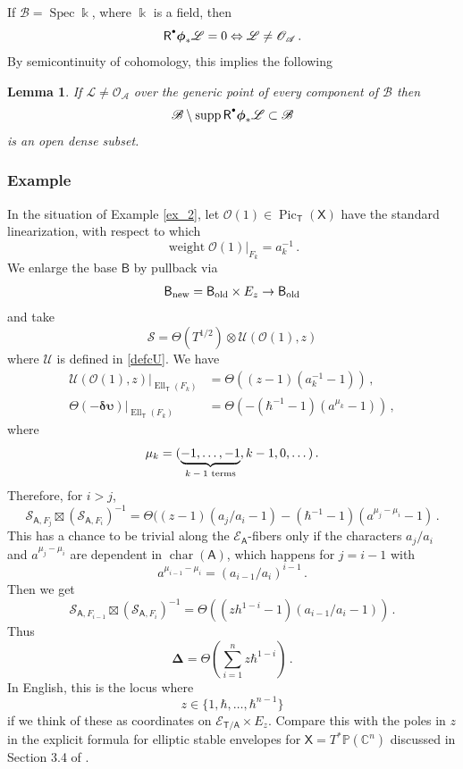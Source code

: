 \documentclass[14pt]{extarticle}
\newcommand{\Rd}{{\mathsf{R}}^{\raisebox{0.5mm}{$\scriptscriptstyle \bullet$}}}
\newcommand{\C}{\mathbb{C}}
\newcommand{\bT}{\mathsf{T}}
\newcommand{\bA}{\mathsf{A}}
\newcommand{\bB}{\mathsf{B}}
\newcommand{\bX}{\mathsf{X}}
\newcommand{\bP}{\mathbb{P}}
\newcommand{\cL}{\mathscr{L}}
\newcommand{\cU}{\mathscr{U}}
\newcommand{\cE}{\mathscr{E}}
\newcommand{\cA}{\mathscr{A}}
\newcommand{\cB}{\mathscr{B}}
\newcommand{\du}{\boldsymbol{\delta\upsilon}}
\newcommand{\bDel}{\boldsymbol{\Delta}}
\newcommand{\bphi}{\boldsymbol{\phi}}
\newcommand{\cS}{\mathscr{S}}
\newcommand{\cO}{\mathscr{O}}
\DeclareMathOperator{\Ell}{Ell}
\DeclareMathOperator{\cha}{char}
\DeclareMathOperator{\Pic}{Pic}
\DeclareMathOperator{\Spec}{Spec}
\DeclareMathOperator{\supp}{supp}
\DeclareMathOperator{\weight}{weight}
\newtheorem{Lemma}{Lemma}[section]
\theoremstyle{definition}
\begin{document}
If $\cB=\Spec \Bbbk$, where $\Bbbk$ is a field, then
%
\begin{equation}
\Rd \bphi_* \cL = 0  \Leftrightarrow \cL \ne \cO_\cA \,.\label{vanishA}
\end{equation}
%
By semicontinuity of cohomology, this implies the following

\begin{Lemma}
If $\cL \ne \cO_\cA$ over the generic point of 
every component of $\cB$ then
$$
\cB \setminus \supp \Rd \bphi_* \cL \subset \cB
$$
is an open dense subset. 
\end{Lemma}



\subsubsection{Example}\label{ex_3}
  In the situation of Example \ref{ex_2}, let $\cO(1) \in \Pic_\bT(\bX)$
  have the standard linearization, with respect to which 
  $$
  \weight \cO(1) \big|_{F_k} = a_k^{-1} \,.
  $$
  We enlarge the base $\bB$ by pullback via 
  \begin{equation}
    \bB_{\textup{new}} = \bB_{\textup{old}} \times E_z \to
    \bB_{\textup{old}}  \label{newS} 
  \end{equation}
  and take
  $$
  \cS= \Theta(T^{1/2})\otimes \cU(\cO(1),z)
  $$
  where $\cU$ is defined in  \eqref{defcU}. We have 
  \begin{align*}
   \cU(\cO(1),z)\big|_{\Ell_\bT(F_k)} &= \Theta((z-1)(a_k^{-1}-1)) \,,
    \\
    \Theta(-\du) \big|_{\Ell_\bT(F_k)} &=
  \Theta(-(\hbar^{-1}-1) (a^{\mu_k}-1)) 
  \, ,
  \end{align*}
  where
  $$
  \mu_k = ( \underbrace{-1, \dots, -1}_\textup{$k-1$ terms}, k-1, 0,
  \dots) \,. 
  $$
  Therefore, for $i>j$, 
  $$
  \cS_{\bA,F_j} \boxtimes \left(
      \cS_{\bA,F_i} \right)^{-1}  = \Theta((z-1)(a_j/a_i-1)-(\hbar^{-1}-1)  (a^{\mu_j-\mu_i}-1)
 \,.
  $$
This has a chance to be trivial along the $\cE_\bA$-fibers only if the
characters $a_j/a_i$ and $a^{\mu_j-\mu_i}$ are dependent in
$\cha(\bA)$, which happens for 
$j=i-1$ with
$$
a^{\mu_{i-1}-\mu_i} =(a_{i-1}/a_i)^{i-1} \,.
$$
Then we get 
 $$
 \cS_{\bA,F_{i-1}} \boxtimes \left(
      \cS_{\bA,F_i} \right)^{-1} = \Theta((z h^{1-i}-1) (a_{i-1}/a_i -1)) \,.
 $$
 Thus
 $$
 \bDel= \Theta\left(\sum_{i=1}^n z \hbar^{1-i}\right) \,. 
 $$
 In English, this is the locus where
 $$
 z\in \{1,\hbar,\dots, \hbar^{n-1}\}
 $$
 if we think of these as coordinates on $\cE_{\bT/\bA} \times E_z$. 
 Compare this with the poles in $z$ in the explicit formula for
 elliptic stable envelopes for $\bX=T^* \bP(\C^n)$ discussed in
 Section 3.4 of \cite{ese}. 
\end{document}
